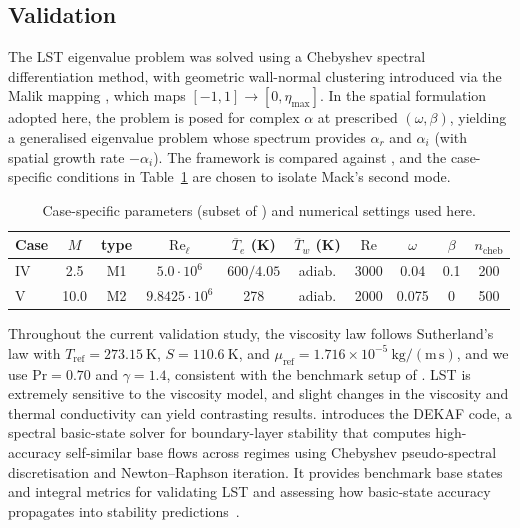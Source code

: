 \subsection{Validation}

The \gls{LST} eigenvalue problem was solved using a Chebyshev spectral differentiation method, with geometric wall-normal clustering introduced via the Malik mapping \citep{Malik1990a}, which maps $[-1,1]\to[0,\eta_{\max}]$. In the spatial formulation adopted here, the problem is posed for complex $\alpha$ at prescribed $(\omega,\beta)$, yielding a generalised eigenvalue problem whose spectrum provides $\alpha_r$ and $\alpha_i$ (with spatial growth rate $-\alpha_i$). The framework is compared against \citet{Groot2018}, and the case-specific conditions in Table~\ref{table:lstcomp} are chosen to isolate Mack's second mode.

\begin{table}[ht]
  \centering
  \caption{Case-specific parameters (subset of \citet{Groot2018}) and numerical settings used here.}
  \label{table:lstcomp}
  \vspace{0.25em}
  \begin{tabular}{@{}lccccccccc@{}}
    \toprule
    Case & $M$ & type & $\mathrm{Re}_\ell$ &
    $\overline{T}_e$ (K) & $\overline{T}_w$ (K) & $\mathrm{Re}$ &
    $\omega$ & $\beta$ & $n_{\mathrm{cheb}}$ \\
    \midrule
    IV & 2.5  & M1 & $5.0\cdot10^{6}$ & $600/4.05$ & adiab. & 3000 & 0.04  & 0.1 & 200 \\
    V  & 10.0 & M2 & $9.8425\cdot10^{6}$ & 278       & adiab. & 2000 & 0.075 & 0   & 500 \\
    \bottomrule
  \end{tabular}
\end{table}

Throughout the current validation study, the viscosity law follows Sutherland's law with $T_{\mathrm{ref}}=273.15\ \mathrm{K}$, $S=110.6\ \mathrm{K}$, and $\mu_{\mathrm{ref}}=1.716\times10^{-5}\ \mathrm{kg/(m\,s)}$, and we use $\mathrm{Pr}=0.70$ and $\gamma=1.4$, consistent with the benchmark setup of \citet{Groot2018}. \gls{LST} is extremely sensitive to the viscosity model, and slight changes in the viscosity and thermal conductivity can yield contrasting results. \cite{Groot2018} introduces the DEKAF code, a spectral basic-state solver for boundary-layer stability that computes high-accuracy self-similar base flows across regimes using Chebyshev pseudo-spectral discretisation and Newton--Raphson iteration. It provides benchmark base states and integral metrics for validating \gls{LST} and assessing how basic-state accuracy propagates into stability predictions~\citep{MiroMiro2019}.

